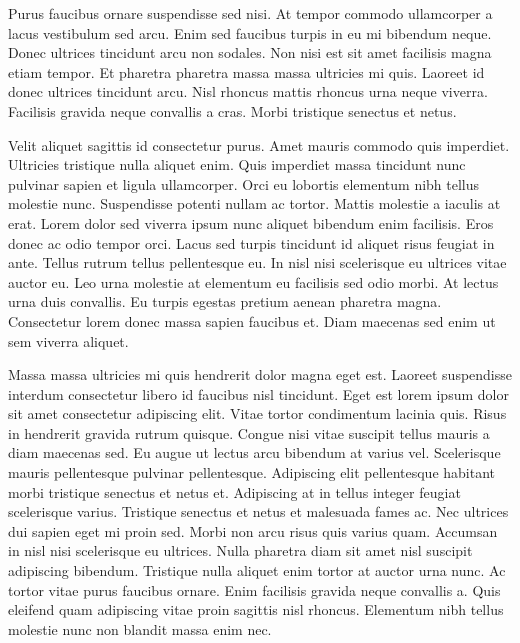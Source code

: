 \documentclass[11pt,a4paper]{article}
\begin{document}
Purus faucibus ornare suspendisse sed nisi. At tempor commodo ullamcorper a lacus vestibulum sed arcu. Enim sed faucibus turpis in eu mi bibendum neque. Donec ultrices tincidunt arcu non sodales. Non nisi est sit amet facilisis magna etiam tempor. Et pharetra pharetra massa massa ultricies mi quis. Laoreet id donec ultrices tincidunt arcu. Nisl rhoncus mattis rhoncus urna neque viverra. Facilisis gravida neque convallis a cras. Morbi tristique senectus et netus.

Velit aliquet sagittis id consectetur purus. Amet mauris commodo quis imperdiet. Ultricies tristique nulla aliquet enim. Quis imperdiet massa tincidunt nunc pulvinar sapien et ligula ullamcorper. Orci eu lobortis elementum nibh tellus molestie nunc. Suspendisse potenti nullam ac tortor. Mattis molestie a iaculis at erat. Lorem dolor sed viverra ipsum nunc aliquet bibendum enim facilisis. Eros donec ac odio tempor orci. Lacus sed turpis tincidunt id aliquet risus feugiat in ante. Tellus rutrum tellus pellentesque eu. In nisl nisi scelerisque eu ultrices vitae auctor eu. Leo urna molestie at elementum eu facilisis sed odio morbi. At lectus urna duis convallis. Eu turpis egestas pretium aenean pharetra magna. Consectetur lorem donec massa sapien faucibus et. Diam maecenas sed enim ut sem viverra aliquet.

Massa massa ultricies mi quis hendrerit dolor magna eget est. Laoreet suspendisse interdum consectetur libero id faucibus nisl tincidunt. Eget est lorem ipsum dolor sit amet consectetur adipiscing elit. Vitae tortor condimentum lacinia quis. Risus in hendrerit gravida rutrum quisque. Congue nisi vitae suscipit tellus mauris a diam maecenas sed. Eu augue ut lectus arcu bibendum at varius vel. Scelerisque mauris pellentesque pulvinar pellentesque. Adipiscing elit pellentesque habitant morbi tristique senectus et netus et. Adipiscing at in tellus integer feugiat scelerisque varius. Tristique senectus et netus et malesuada fames ac. Nec ultrices dui sapien eget mi proin sed. Morbi non arcu risus quis varius quam. Accumsan in nisl nisi scelerisque eu ultrices. Nulla pharetra diam sit amet nisl suscipit adipiscing bibendum. Tristique nulla aliquet enim tortor at auctor urna nunc. Ac tortor vitae purus faucibus ornare. Enim facilisis gravida neque convallis a. Quis eleifend quam adipiscing vitae proin sagittis nisl rhoncus. Elementum nibh tellus molestie nunc non blandit massa enim nec.
\end{document}
